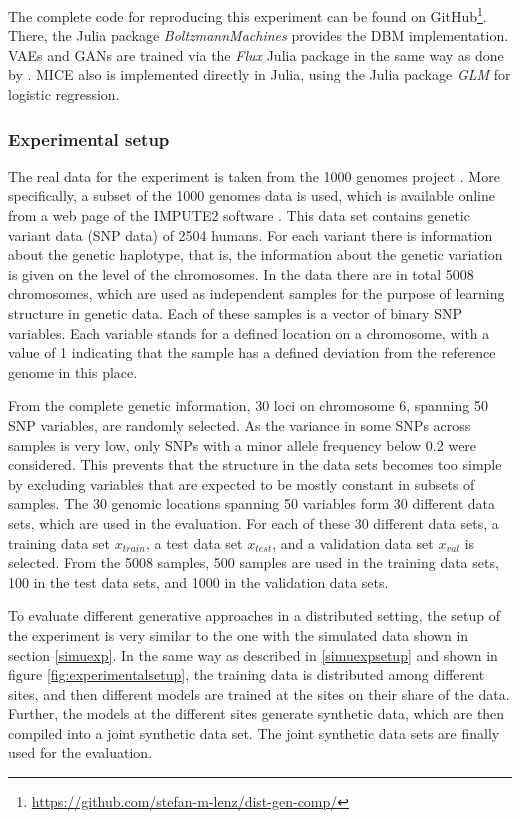 \documentclass[12pt]{article}
\newcommand{\apkg}[1]{\emph{#1}}
\begin{document}
The complete code for reproducing this experiment can be found on GitHub\footnote{\url{https://github.com/stefan-m-lenz/dist-gen-comp/}}.
There, the Julia package \apkg{BoltzmannMachines} provides the DBM implementation.
VAEs and GANs are trained via the \apkg{Flux} Julia package in the same way as done by \cite{nussberger_synthetic_2020}. MICE also is implemented directly in Julia, using the Julia package \apkg{GLM} \citep{juliaglm} for logistic regression.

\subsubsection{Experimental setup}\label{realexpsetup}

The real data for the experiment is taken from the 1000 genomes project \citep{1000genomes}.
More specifically, a subset of the 1000 genomes data is used, which is available online from a web page \citep{impute_1000_genomes} of the IMPUTE2 software \citep{impute2}.
This data set contains genetic variant data (SNP data) of 2504 humans.
For each variant there is information about the genetic haplotype, that is, the information about the genetic variation is given on the level of the chromosomes.
In the data there are in total 5008 chromosomes, which are used as independent samples for the purpose of learning structure in genetic data.
Each of these samples is a vector of binary SNP variables.
Each variable stands for a defined location on a chromosome, with a value of 1 indicating that the sample has a defined deviation from the reference genome in this place.

From the complete genetic information, 30 loci on chromosome 6, spanning 50 SNP variables, are randomly selected.
As the variance in some SNPs across samples is very low, only SNPs with a minor allele frequency below 0.2 were considered.
This prevents that the structure in the data sets becomes too simple by excluding variables that are expected to be mostly constant in subsets of samples.
The 30 genomic locations spanning 50 variables form 30 different data sets, which are used in the evaluation.
For each of these 30 different data sets, a training data set $x_{train}$, a test data set $x_{test}$, and a validation data set $x_{val}$ is selected.
From the 5008 samples, 500 samples are used in the training data sets, 100 in the test data sets, and 1000 in the validation data sets.

To evaluate different generative approaches in a distributed setting, 
the setup of the experiment is very similar to the one with the simulated data shown in section \ref{simuexp}.
In the same way as described in \ref{simuexpsetup} and shown in figure \ref{fig:experimentalsetup},
the training data is distributed among different sites, and then different models are trained at the sites on their share of the data.
Further, the models at the different sites generate synthetic data, which are then compiled into a joint synthetic data set.
The joint synthetic data sets are finally used for the evaluation.
\end{document}
